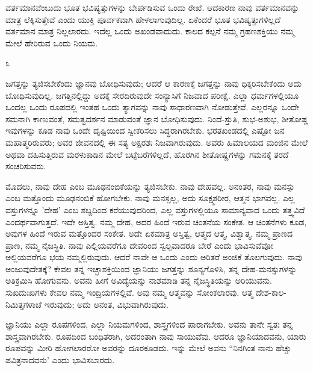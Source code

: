 ವರ್ತಮಾನವೆಂಬುದು ಭೂತ ಭವಿಷ್ಯತ್ತುಗಳನ್ನು ಬೇರ್ಪಡಿಸುವ ಒಂದು ರೇಖೆ. ಆದಕಾರಣ ನಾವು ವರ್ತಮಾನವನ್ನು ಮಾತ್ರ ಲೆಕ್ಕಿಸುತ್ತೇವೆ ಎಂದು ಯುಕ್ತಿ ಪೂರ್ವಕವಾಗಿ ಹೇಳಲಾಗುವುದಿಲ್ಲ. ಏಕೆಂದರೆ ಭೂತ ಭವಿಷ್ಯತ್ತುಗಳಿಲ್ಲದೆ ವರ್ತಮಾನ ಮಾತ್ರ ನಿಲ್ಲಲಾರದು. ಇದೆಲ್ಲ ಒಂದು ಅಖಂಡವಾದುದು. ಕಾಲದ ಕಲ್ಪನೆ ನಮ್ಮ ಗ್ರಹಣಶಕ್ತಿಯು ನಮ್ಮ ಮೇಲೆ ಹೇರಿರುವ ಒಂದು ನಿಯಮ.

\begin{center}
೩
\end{center}

ಜಗತ್ತನ್ನು ತ್ಯಜಿಸಬೇಕೆಂದು ಜ್ಞಾನವು ಬೋಧಿಸುವುದು; ಆದರೆ ಆ ಕಾರಣಕ್ಕೆ ಜಗತ್ತನ್ನು ನಾವು ಧಿಕ್ಕರಿಸಬೇಕೆಂದು ಅದು ಬೋಧಿಸುವುದಿಲ್ಲ. ಜಗತ್ತಿನಲ್ಲಿದ್ದು ಅದಕ್ಕೆ ಸೇರದಿರುವುದೇ ಸಂನ್ಯಾಸಿಗೆ ನಿಜವಾದ ಪರೀಕ್ಷೆ. ಎಲ್ಲಾ ಧರ್ಮಗಳಲ್ಲಿಯೂ ಒಂದಲ್ಲ ಒಂದು ರೂಪದಲ್ಲಿ ಇಂತಹ ಒಂದು ತ್ಯಾಗವನ್ನು ನಾವು ಸಾಧಾರಣವಾಗಿ ನೋಡುತ್ತೇವೆ. ಎಲ್ಲರನ್ನೂ ಒಂದೇ ಸಮನಾಗಿ ಕಾಣುವಂತೆ, ಸಮತ್ವದರ್ಶನ ಮಾಡುವಂತೆ ಜ್ಞಾನ ಬೋಧಿಸುವುದು. ನಿಂದೆ-ಸ್ತುತಿ, ಶುಭ-ಅಶುಭ, ಶೀತೋಷ್ಣ ಇವುಗಳನ್ನು ಕೂಡ ನಾವು ಒಂದೇ ದೃಷ್ಟಿಯಿಂದ ಸ್ವೀಕರಿಸಲು ಸಿದ್ಧರಾಗಿರಬೇಕು. ಭರತಖಂಡದಲ್ಲಿ ಎಷ್ಟೋ ಜನ ಮಹಾತ್ಮರಿರುವರು; ಅವರ ಜೀವನದಲ್ಲಿ ಈ ಸತ್ಯ ಅಕ್ಷರಶಃ ನಿಜವಾಗಿರುವುದು. ಅವರು ಹಿಮಾಲಯದ ಮಂಜಿನ ಮೇಲೆ ಅಥವಾ ದಹಿಸುತ್ತಿರುವ ಮರಳುಕಾಡಿನ ಮೇಲೆ ಬಟ್ಟೆಬರೆಗಳಿಲ್ಲದೆ, ಹೊರಗಿನ ಶೀತೋಷ್ಣಗಳನ್ನು ಗಮನಕ್ಕೆ ತರದೆ ಸಂಚರಿಸುವರು.

ಮೊದಲು, ನಾವು ದೇಹ ಎಂಬ ಮೂಢನಂಬಿಕೆಯನ್ನು ತ್ಯಜಿಸಬೇಕು. ನಾವು ದೇಹವಲ್ಲ. ಅನಂತರ, ನಾವು ಮನಸ್ಸು ಎಂಬ ಮತ್ತೊಂದು ಮೂಢನಂಬಿಕೆ ಹೋಗಬೇಕು. ನಾವು ಮನಸ್ಸಲ್ಲ, ಅದು ಸೂಕ್ಷ್ಮಶರೀರ, ಆತ್ಮನ ಭಾಗವಲ್ಲ. ಎಲ್ಲ ವಸ್ತುಗಳನ್ನೂ 'ದೇಹ' ಎಂಬ ಶಬ್ದದಿಂದ ಕರೆಯುವುದರಿಂದ, ಎಲ್ಲ ವಸ್ತುಗಳಲ್ಲಿಯೂ ಸಾಮಾನ್ಯವಾದ ಒಂದು ತತ್ತ್ವವಿದೆ ಎಂದರ್ಥವಾಗುತ್ತದೆ. ಇದೇ ಅಸ್ತಿತ್ವ. ನಮ್ಮ ದೇಹ, ಅದರ ಹಿಂದೆ ಇರುವ ಚಿಂತನೆಯ ಸಂಕೇತ. ಆ ಚಿಂತನೆಗಳು ಕೂಡ, ಅವುಗಳ ಹಿಂದೆ ಇರುವ ಮತ್ತೊಂದರ ಸಂಕೇತ. ಅದೇ ಏಕಮಾತ್ರ ಅಸ್ತಿತ್ವ, ಆತ್ಮದ ಆತ್ಮ, ವಿಶ್ವಾತ್ಮ, ನಮ್ಮ ಪ್ರಾಣದ ಪ್ರಾಣ, ನಮ್ಮ ನೈಜಸ್ಥಿತಿ. ನಾವು ಎಲ್ಲಿಯವರೆಗೂ ದೇವರಿಂದ ಸ್ವಲ್ಪವಾದರೂ ಬೇರೆ ಎಂದು ಭಾವಿಸುವೆವೋ ಅಲ್ಲಿಯವರೆಗೂ ಭಯ ನಮ್ಮಲ್ಲಿರುವುದು. ಆದರೆ ನಾವೇ ಆ ಒಂದು ಎಂದು ಅರಿತರೆ ಅಂಜಿಕೆ ತೊಲಗುವುದು. ನಾವು ಅಂಜುವುದೇತಕ್ಕೆ? ಕೇವಲ ತನ್ನ ಇಚ್ಛಾಶಕ್ತಿಯಿಂದ ಜ್ಞಾನಿಯು ಜಗತ್ತನ್ನು ಶೂನ್ಯಗೊಳಿಸಿ, ತನ್ನ ದೇಹ-ಮನಸ್ಸುಗಳನ್ನು ಅತಿಕ್ರಮಿಸಿ ಹೋಗುವನು. ಅವನು ಹೀಗೆ ಅವಿದ್ಯೆಯನ್ನು ನಾಶಮಾಡಿ ತನ್ನ ನೈಜಸ್ಥಿತಿಯನ್ನು ಅರಿಯುವನು. ಸುಖದುಃಖಗಳು ಕೇವಲ ನಮ್ಮ ಇಂದ್ರಿಯಗಳಲ್ಲಿವೆ. ಅವು ನಮ್ಮ ಆತ್ಮವನ್ನು ಸೋಂಕಲಾರವು. ಆತ್ಮ ದೇಶ-ಕಾಲ-ನಿಮಿತ್ತಗಳಾಚೆ ಇರುವುದು; ಅದು ಅನಂತ, ವಿಭುವಾಗಿರುವುದು.

ಜ್ಞಾನಿಯು ಎಲ್ಲಾ ರೂಪಗಳಿಂದ, ಎಲ್ಲಾ ನಿಯಮಗಳಿಂದ, ಶಾಸ್ತ್ರಗಳಿಂದ ಪಾರಾಗಬೇಕು. ಅವನು ತಾನೇ ಸ್ವತಃ ತನ್ನ ಶಾಸ್ತ್ರವಾಗಿರಬೇಕು. ರೂಪದಿಂದ ಬಂಧಿತರಾಗಿ, ಅದರಂತಾಗಿ ನಾವು ಸಾಯುವೆವು. ಆದರೂ ಜ್ಞಾನಿಯಾದವನು, ಯಾರು ರೂಪವನ್ನು ಮೀರಿ ಹೋಗಲಾರರೋ ಅವರನ್ನು ದೂರಕೂಡದು. ಇನ್ನು ಮೇಲೆ ಅವನು “ನಿನಗಿಂತ ನಾನು ಹೆಚ್ಚು ಪವಿತ್ರನಾದವನು' ಎಂದು ಭಾವಿಸಬಾರದು.

